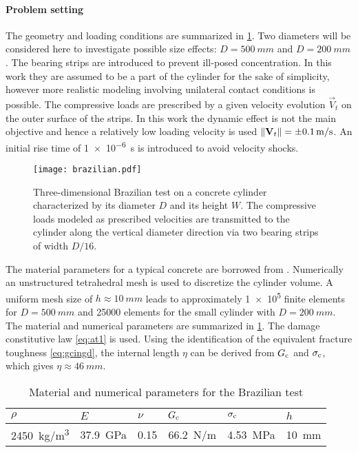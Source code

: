 \paragraph{Problem setting} The geometry and loading conditions are summarized in \cref{fig:brazilian}. Two diameters will be considered here to investigate possible size effects: $D=\SI{500}{mm}$ and $D=\SI{200}{mm}$. The bearing strips are introduced to prevent ill-posed concentration. In this work they are assumed to be a part of the cylinder for the sake of simplicity, however more realistic modeling involving unilateral contact conditions is possible. The compressive loads are prescribed by a given velocity evolution $\vec{V}_t$ on the outer surface of the strips. In this work the dynamic effect is not the main objective and hence a relatively low loading velocity is used $\norm{\vec{V}_t}=\SI{\pm 0.1}{m/s}$. An initial rise time of \SI{1e-6}{s} is introduced to avoid velocity shocks.
\begin{figure}[htbp]
\centering
\texttt{[image: brazilian.pdf]}
\caption{Three-dimensional Brazilian test on a concrete cylinder characterized by its diameter $D$ and its height $W$. The compressive loads modeled as prescribed velocities are transmitted to the cylinder along the vertical diameter direction via two bearing strips of width $D/16$.} \label{fig:brazilian}
\end{figure}
The material parameters for a typical concrete are borrowed from \cite{RuizOrtizPandolfi:2000}. Numerically an unstructured tetrahedral mesh is used to discretize the cylinder volume. A uniform mesh size of $h\approx\SI{10}{mm}$ leads to approximately \num{1e5} finite elements for $D=\SI{500}{mm}$ and \num{25000} elements for the small cylinder with $D=\SI{200}{mm}$. The material and numerical parameters are summarized in \cref{tab:brazilian}. The damage constitutive law \eqref{eq:at1} is used. Using the identification of the equivalent fracture toughness \eqref{eq:gcingd}, the internal length $\eta$ can be derived from $G_\mathrm{c}$ and $\sigma_{\mathrm{c}}$, which gives $\eta\approx \SI{46}{mm}$.
\begin{table}[htbp]
\centering
\caption{Material and numerical parameters for the Brazilian test} \label{tab:brazilian}
\begin{tabular}{llllll} \toprule
$\rho$ & $E$ & $\nu$ & $G_\mathrm{c}$ & $\sigma_{\mathrm{c}}$ & $h$ \\ \midrule
\SI{2450}{kg/m^3} & \SI{37.9}{GPa} & 0.15 & \SI{66.2}{N/m} & \SI{4.53}{MPa} & \SI{10}{mm} \\ \bottomrule
\end{tabular}
\end{table}

